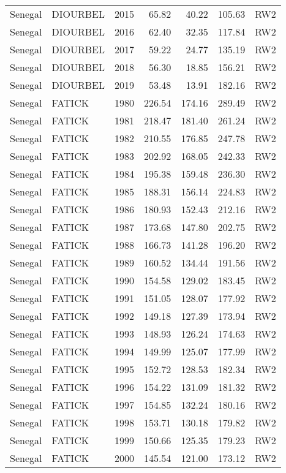 \begin{longtable}{lllrrrl}
  Senegal & DIOURBEL & 2015 & 65.82 & 40.22 & 105.63 & RW2 \\ 
  Senegal & DIOURBEL & 2016 & 62.40 & 32.35 & 117.84 & RW2 \\ 
  Senegal & DIOURBEL & 2017 & 59.22 & 24.77 & 135.19 & RW2 \\ 
  Senegal & DIOURBEL & 2018 & 56.30 & 18.85 & 156.21 & RW2 \\ 
  Senegal & DIOURBEL & 2019 & 53.48 & 13.91 & 182.16 & RW2 \\ 
  Senegal & FATICK & 1980 & 226.54 & 174.16 & 289.49 & RW2 \\ 
  Senegal & FATICK & 1981 & 218.47 & 181.40 & 261.24 & RW2 \\ 
  Senegal & FATICK & 1982 & 210.55 & 176.85 & 247.78 & RW2 \\ 
  Senegal & FATICK & 1983 & 202.92 & 168.05 & 242.33 & RW2 \\ 
  Senegal & FATICK & 1984 & 195.38 & 159.48 & 236.30 & RW2 \\ 
  Senegal & FATICK & 1985 & 188.31 & 156.14 & 224.83 & RW2 \\ 
  Senegal & FATICK & 1986 & 180.93 & 152.43 & 212.16 & RW2 \\ 
  Senegal & FATICK & 1987 & 173.68 & 147.80 & 202.75 & RW2 \\ 
  Senegal & FATICK & 1988 & 166.73 & 141.28 & 196.20 & RW2 \\ 
  Senegal & FATICK & 1989 & 160.52 & 134.44 & 191.56 & RW2 \\ 
  Senegal & FATICK & 1990 & 154.58 & 129.02 & 183.45 & RW2 \\ 
  Senegal & FATICK & 1991 & 151.05 & 128.07 & 177.92 & RW2 \\ 
  Senegal & FATICK & 1992 & 149.18 & 127.39 & 173.94 & RW2 \\ 
  Senegal & FATICK & 1993 & 148.93 & 126.24 & 174.63 & RW2 \\ 
  Senegal & FATICK & 1994 & 149.99 & 125.07 & 177.99 & RW2 \\ 
  Senegal & FATICK & 1995 & 152.72 & 128.53 & 182.34 & RW2 \\ 
  Senegal & FATICK & 1996 & 154.22 & 131.09 & 181.32 & RW2 \\ 
  Senegal & FATICK & 1997 & 154.85 & 132.24 & 180.16 & RW2 \\ 
  Senegal & FATICK & 1998 & 153.71 & 130.18 & 179.82 & RW2 \\ 
  Senegal & FATICK & 1999 & 150.66 & 125.35 & 179.23 & RW2 \\ 
  Senegal & FATICK & 2000 & 145.54 & 121.00 & 173.12 & RW2 \\ 

\end{longtable}

